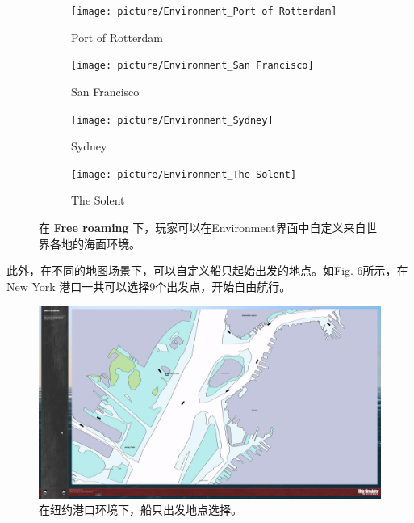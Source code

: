 \documentclass[letterpaper,10pt]{article}
\begin{document}
\begin{figure}[htbp]
					\begin{subfigure}{0.24\textwidth}
						\texttt{[image: picture/Environment\_Port of Rotterdam]}
						\captionsetup{font=scriptsize}
						\caption{Port of Rotterdam}
						\label{fig: Environment_Port of Rotterdam}
					\end{subfigure}
					\begin{subfigure}{0.24\textwidth}
						\texttt{[image: picture/Environment\_San Francisco]}
						\captionsetup{font=scriptsize}
						\caption{San Francisco}
						\label{fig: Environment_San Francisco}
					\end{subfigure}
					\begin{subfigure}{0.24\textwidth}
						\texttt{[image: picture/Environment\_Sydney]}
						\captionsetup{font=scriptsize}
						\caption{Sydney}
						\label{fig: Environment_Sydney}	
					\end{subfigure}
					\begin{subfigure}{0.24\textwidth}
						\texttt{[image: picture/Environment\_The Solent]}
						\captionsetup{font=scriptsize}
						\caption{The Solent}
						\label{fig: Environment_The Solent}	
					\end{subfigure}
					
					\captionsetup{font=scriptsize}
					\caption{
						\label{fig: Environment selection}
						在 \textbf{Free roaming} 下，玩家可以在Environment界面中自定义来自世界各地的海面环境。
					}
				\end{figure}
				
				此外，在不同的地图场景下，可以自定义船只起始出发的地点。如Fig. \ref{fig: Starting point selection}所示，在 New York 港口一共可以选择9个出发点，开始自由航行。
				
				\begin{figure}[htbp]
					\centering 
					\includegraphics[width=\columnwidth]{picture/Starting point selection}
					\caption{
						\label{fig: Starting point selection} 
						在纽约港口环境下，船只出发地点选择。
					}	
				\end{figure}
				
\end{document}
